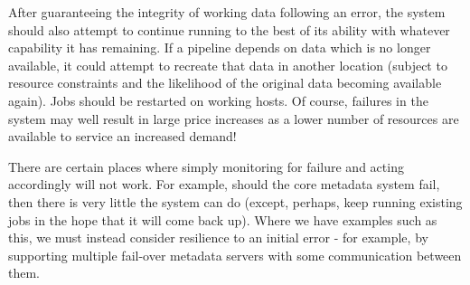 \documentclass[10pt,a4paper]{article}
\newcommand{\npar}{\par\noindent\space}
\begin{document}
\npar After guaranteeing the integrity of working data following an error, the system should also attempt to continue running to the best of its ability with whatever capability it has remaining. If a pipeline depends on data which is no longer available, it could attempt to recreate that data in another location (subject to resource constraints and the likelihood of the original data becoming available again). Jobs should be restarted on working hosts. Of course, failures in the system may well result in large price increases as a lower number of resources are available to service an increased demand!
\npar There are certain places where simply monitoring for failure and acting accordingly will not work. For example, should the core metadata system fail, then there is very little the system can do (except, perhaps, keep running existing jobs in the hope that it will come back up). Where we have examples such as this, we must instead consider resilience to an initial error - for example, by supporting multiple fail-over metadata servers with some communication between them.
\end{document}
